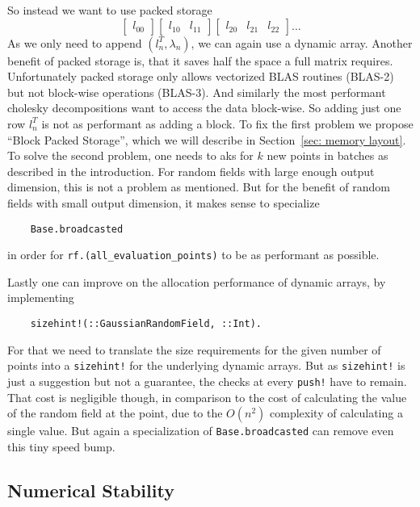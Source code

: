So instead we want to use packed storage
\[
	\begin{bmatrix}
		l_{00}	
	\end{bmatrix}
	\begin{bmatrix}
		l_{10} & l_{11}
	\end{bmatrix}
	\begin{bmatrix}
		l_{20} & l_{21} & l_{22}
	\end{bmatrix}
	\dots
\]
As we only need to append \((l_n^T, \lambda_n)\), we can again use a dynamic
array. Another benefit of packed storage is, that it saves half the space a
full matrix requires. Unfortunately packed storage only allows vectorized BLAS routines
(BLAS-2) but not block-wise operations (BLAS-3). And similarly the most performant
cholesky decompositions want to access the data block-wise. So adding just one
row \(l_n^T\) is not as performant as adding a block. To fix the first problem
we propose ``Block Packed Storage'', which we will describe in Section~\ref{sec: memory layout}. To solve the second problem, one needs to aks for \(k\) new points in
batches as described in the introduction. For random fields with large enough
output dimension, this is not a problem as mentioned. But for the benefit of
random fields with small output dimension, it makes sense to specialize
\begin{verbatim}
	Base.broadcasted
\end{verbatim}
in order for \texttt{rf.(all_evaluation_points)} to be as performant
as possible.

Lastly one can improve on the allocation performance of dynamic arrays, by implementing
\begin{verbatim}
	sizehint!(::GaussianRandomField, ::Int).
\end{verbatim}
For that we need to translate the size requirements for the given number of
points into a \texttt{sizehint!} for the underlying dynamic arrays.
But as \texttt{sizehint!} is just a suggestion but not a guarantee,
the checks at every \texttt{push!} have to remain. That
cost is negligible though, in comparison to the cost of calculating the
value of the random field at the point, due to the \(O(n^2)\) complexity of
calculating a single value. But again a specialization of
\texttt{Base.broadcasted} can remove even this tiny speed bump.

\subsection{Numerical Stability}

